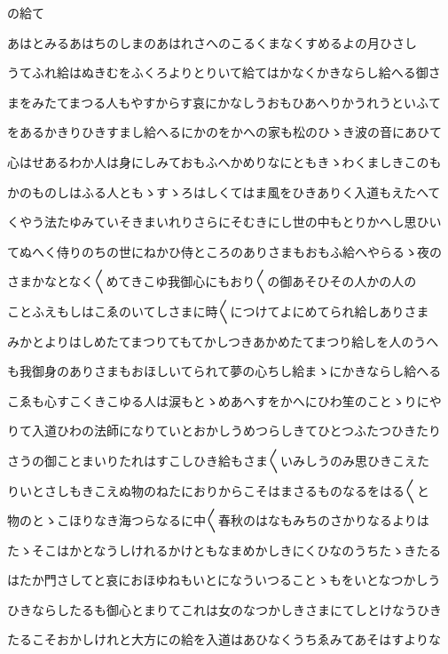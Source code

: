 \documentclass[a4paper,11pt,landscape]{ltjtarticle}
\begin{document}
\par\medskip
の給て
\par\medskip
あはとみるあはちのしまのあはれさへのこるくまなくすめるよの月ひさし
\par\medskip
うてふれ給はぬきむをふくろよりとりいて給てはかなくかきならし給へる御さ
\par\medskip
まをみたてまつる人もやすからす哀にかなしうおもひあへりかうれうといふて
\par\medskip
をあるかきりひきすまし給へるにかのをかへの家も松のひゝき波の音にあひて
\par\medskip
心はせあるわか人は身にしみておもふへかめりなにともきゝわくましきこのも
\par\medskip
かのものしはふる人ともゝすゝろはしくてはま風をひきありく入道もえたへて
\par\medskip
くやう法たゆみていそきまいれりさらにそむきにし世の中もとりかへし思ひい
\par\medskip
てぬへく侍りのちの世にねかひ侍ところのありさまもおもふ給へやらるゝ夜の
\par\medskip
さまかなとなく〱めてきこゆ我御心にもおり〱の御あそひその人かの人の
\par\medskip
ことふえもしはこゑのいてしさまに時〱につけてよにめてられ給しありさま
\par\medskip
みかとよりはしめたてまつりてもてかしつきあかめたてまつり給しを人のうへ
\par\medskip
も我御身のありさまもおほしいてられて夢の心ちし給まゝにかきならし給へる
\par\medskip
こゑも心すこくきこゆる人は涙もとゝめあへすをかへにひわ笙のことゝりにや
\par\medskip
りて入道ひわの法師になりていとおかしうめつらしきてひとつふたつひきたり
\par\medskip
さうの御ことまいりたれはすこしひき給もさま〱いみしうのみ思ひきこえた
\par\medskip
りいとさしもきこえぬ物のねたにおりからこそはまさるものなるをはる〱と
\par\medskip
物のとゝこほりなき海つらなるに中〱春秋のはなもみちのさかりなるよりは
\par\medskip
たゝそこはかとなうしけれるかけともなまめかしきにくひなのうちたゝきたる
\par\medskip
はたか門さしてと哀におほゆねもいとになういつることゝもをいとなつかしう
\par\medskip
ひきならしたるも御心とまりてこれは女のなつかしきさまにてしとけなうひき
\par\medskip
たるこそおかしけれと大方にの給を入道はあひなくうちゑみてあそはすよりな
\end{document}

